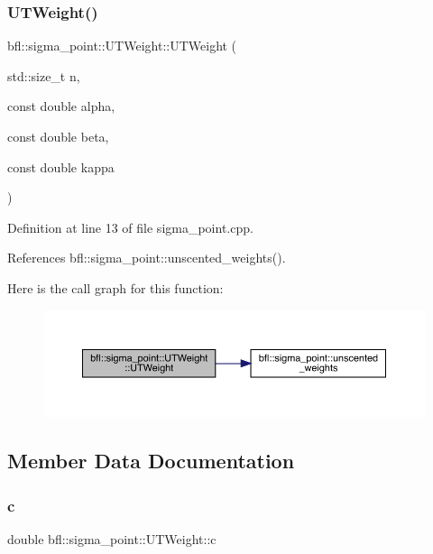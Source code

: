 \subsubsection{\texorpdfstring{U\+T\+Weight()}{UTWeight()}}
{\footnotesize\ttfamily bfl\+::sigma\+\_\+point\+::\+U\+T\+Weight\+::\+U\+T\+Weight (\begin{DoxyParamCaption}\item[{std\+::size\+\_\+t}]{n,  }\item[{const double}]{alpha,  }\item[{const double}]{beta,  }\item[{const double}]{kappa }\end{DoxyParamCaption})}



Definition at line 13 of file sigma\+\_\+point.\+cpp.



References bfl\+::sigma\+\_\+point\+::unscented\+\_\+weights().

Here is the call graph for this function\+:
\nopagebreak
\begin{figure}[H]
\begin{center}
\leavevmode
\includegraphics[width=350pt]{structbfl_1_1sigma__point_1_1UTWeight_a72931837cdd99f042be08a99deaa54d2_cgraph}
\end{center}
\end{figure}


\subsection{Member Data Documentation}
\mbox{\label{structbfl_1_1sigma__point_1_1UTWeight_a861b9163db2779b84d7af79ba03e4203}} 
\subsubsection{\texorpdfstring{c}{c}}
{\footnotesize\ttfamily double bfl\+::sigma\+\_\+point\+::\+U\+T\+Weight\+::c}



